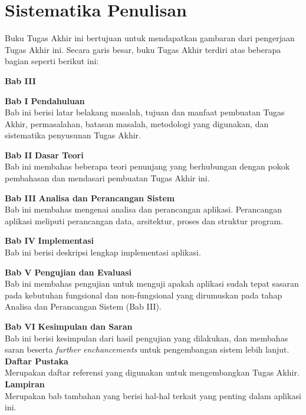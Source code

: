     \section{Sistematika Penulisan}	
	    Buku Tugas Akhir ini bertujuan untuk mendapatkan gambaran dari pengerjaan Tugas Akhir ini. Secara garis besar, buku Tugas Akhir terdiri atas beberapa bagian seperti berikut ini:
	    \begin{labeling}{\textbf{Bab III}}
	    	\item[\textbf{Bab I}] 
		    	\textbf{Pendahuluan}\\
				Bab ini berisi latar belakang masalah, tujuan dan manfaat pembuatan Tugas Akhir, permasalahan, batasan masalah, metodologi yang digunakan, dan sistematika penyusunan Tugas Akhir. 
	    	\item[\textbf{Bab II}] \textbf{Dasar Teori} \\
		    	Bab ini membahas beberapa teori penunjang yang berhubungan dengan pokok pembahasan dan mendasari pembuatan Tugas Akhir ini. 
	    	\item[\textbf{Bab III}] \textbf{Analisa dan Perancangan Sistem} \\ 
		    	Bab ini membahas mengenai analisa dan perancangan aplikasi. Perancangan aplikasi meliputi perancangan data, arsitektur, proses dan struktur program.
	    	\item[\textbf{Bab IV}] \textbf{Implementasi} \\
		    	Bab ini berisi deskripsi lengkap implementasi aplikasi.		    	
	    	\item[\textbf{Bab V}] \textbf{Pengujian dan Evaluasi} \\
		    	Bab ini membahas pengujian untuk menguji apakah aplikasi sudah tepat sasaran pada kebutuhan fungsional dan non-fungsional yang dirumuskan pada tahap Analisa dan Perancangan Sistem (Bab III).
	    	\item[\textbf{Bab VI}] 	\textbf{Kesimpulan dan Saran}\\
    	Bab ini berisi kesimpulan dari hasil pengujian yang dilakukan, dan membahas saran beserta \textit{further enchancements} untuk pengembangan sistem lebih lanjut. \\
\textbf{Daftar Pustaka}\\
Merupakan daftar referensi yang digunakan untuk mengembangkan Tugas Akhir.\\
		\textbf{Lampiran}\\
		Merupakan bab tambahan yang berisi hal-hal terkait yang penting dalam aplikasi ini.
		\end{labeling}